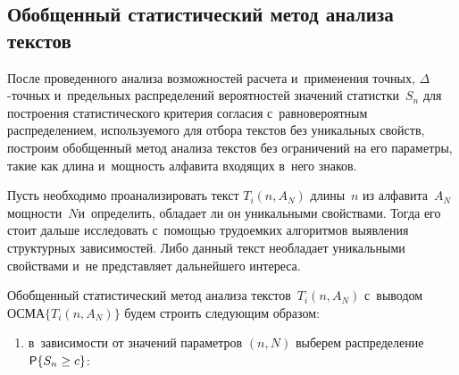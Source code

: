 \begin{multicols}{2}
\section{Обобщенный статистический метод анализа текстов}

\vspace*{-1pt}

    После проведенного анализа возможностей расче\-та и~применения 
точных, $\Delta$-точ\-ных и~предельных распределений вероятностей 
значений статистки~$S_n$ для построения статистического критерия 
согласия с~равновероятным распределением, используемого для отбора 
текстов без уникальных свойств, построим обобщенный метод анализа 
текстов без ограничений на его параметры, такие как длина и~мощность 
алфавита входящих в~него знаков.
{

}
    
    Пусть необходимо проанализировать текст $T_i(n, A_N)$ длины~$n$ 
из алфавита~$A_N$ мощности~$N$\linebreak и~определить, обладает ли он 
уникальными свойствами. Тогда его стоит дальше исследовать с~по\-мощью 
трудоемких алгоритмов выявления структурных зависимостей. Либо 
данный текст не\linebreak обладает уникальными свойствами и~не представляет 
дальнейшего интереса. 
    
     Обобщенный статистический метод анализа текстов~$T_i(n, A_N)$ 
с~выводом $\mathrm{ОСМА}\{T_i(n, A_N)\}$ будем строить следующим 
образом:
     \begin{enumerate}[(1)]
     \item в~зависимости от значений параметров $(n, N)$ выберем 
распределение ${\sf P}\{S_n \hm\geq c\}$:


\end{enumerate}
\end{multicols}
